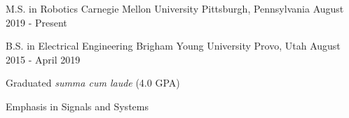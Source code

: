

\begin{cventries}
\scventry
    {M.S. in Robotics} %
    {Carnegie Mellon University} %
    {Pittsburgh, Pennsylvania} %
    {August 2019 - Present} %

    
  \cventry
    {B.S. in Electrical Engineering} %
    {Brigham Young University} %
    {Provo, Utah} %
    {August 2015 - April 2019} %
    {
      \begin{cvitems}
        \item {Graduated \textit{summa cum laude} (4.0 GPA)}
        \item {Emphasis in Signals and Systems}
      \end{cvitems}
    }
\end{cventries}
